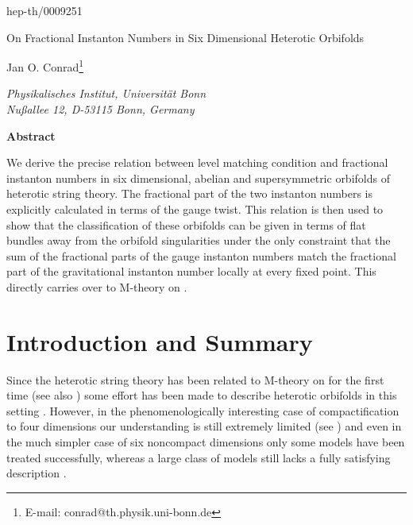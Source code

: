 \documentclass[a4paper,12pt,twoside]{article}
\numberwithin{equation}{section}
\providecommand{\pE}{\text{E}  }     %
\providecommand{\mZ}{\mathbb{Z}}
\begin{document}
\begin{titlepage}

\noindent\hfill hep-th/0009251


\vfill

\begin{center}
  \begin{center}
    \Huge On Fractional Instanton Numbers in Six Dimensional Heterotic
    \myHighlight{$\pE_8 \times \pE_8$}\coordHE{} Orbifolds
  \end{center}


  \vspace{1.5cm}

  Jan O. Conrad\footnote{E-mail: conrad@th.physik.uni-bonn.de}

  \smallskip

  {\it Physikalisches Institut, Universit\"at Bonn\\
    Nu\ss{}allee 12, D-53115 Bonn, Germany}
    

  \vfill

  {\bf Abstract}
  
  \bigskip

  \parbox{0.9\textwidth}{%
    We derive the precise relation between level matching condition
    and fractional instanton numbers in six dimensional, abelian and
    supersymmetric orbifolds of \myHighlight{$\pE_8 \times \pE_8$}\coordHE{} heterotic string
    theory. The fractional part of the two \myHighlight{$\pE_8$}\coordHE{} instanton numbers
    is explicitly calculated in terms of the gauge twist.  This
    relation is then used to show that the classification of these
    orbifolds can be given in terms of flat bundles away from the
    orbifold singularities under the only constraint that the sum of
    the fractional parts of the gauge instanton numbers match the
    fractional part of the gravitational instanton number locally at
    every fixed point. This directly carries over to M-theory on
    \myHighlight{$S^1/\mZ_2$}\coordHE{}.}

\end{center}

\vfill

\end{titlepage}

\section{Introduction and Summary}


Since the \myHighlight{$\pE_8 \times \pE_8$}\coordHE{} heterotic string theory has been
related to M-theory on \myHighlight{$S^1/\mZ_2$}\coordHE{} for the first time \cite{HWI,HWII}
(see also \cite{HetTypeI}) some effort has been made to describe
heterotic orbifolds in this setting \cite{Stieberger, OvrutI,
  Kaplunovsky, OvrutII}. However, in the phenomenologically
interesting case of compactification to four dimensions our
understanding is still extremely limited (see \cite{KaplSUSY2K}) and
even in the much simpler case of six noncompact dimensions only some
models have been treated successfully, whereas a large class of models
still lacks a fully satisfying description \cite{Kaplunovsky}.
\end{document}
